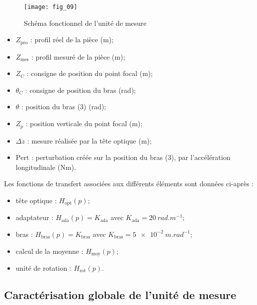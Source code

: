 \begin{figure}[H]
\centering
\texttt{[image: fig\_09]}
\caption{\label{fig_09} Schéma fonctionnel de l’unité de mesure}
\end{figure}

\begin{multicols}{2}
\begin{itemize}
\item $Z_{\text{pro}}$ : profil réel de la pièce (m);
\item $Z_{\text{mes}}$ : profil mesuré de la pièce (m);
\item $Z_{C}$ : consigne de position du point focal (m);
\item $\theta_{C}$ : consigne de position du bras (\si{rad});
\item $\theta$ : position du bras (3) (\si{rad});
\item $Z_{p}$ : position verticale du point focal (m);
\item $\Delta z$ : mesure réalisée par la tête optique (m);
\item $\text{Pert}$ : perturbation créée sur la position du bras (3), par l'accélération longitudinale (\si{Nm}).
\end{itemize}
\end{multicols}

Les fonctions de transfert associées aux différents éléments sont données ci-après : 
\begin{itemize}
\item tête optique : $H_{\text{opt}}(p)$;
\item adaptateur : $H_{\text{ada}}(p)=K_{\text{ada}}$ avec $K_{\text{ada}}=\SI{20}{rad.m^{-1}}$;
\item bras : $H_{\text{bras}}(p)=K_{\text{bras}}$ avec $K_{\text{bras}}=\SI{5e-2}{m.rad^{-1}}$;
\item calcul de la moyenne : $H_{\text{moy}}(p)$;
\item unité de rotation : $H_{\text{rot}}(p)$.
\end{itemize}




\subsection{Caractérisation globale de l'unité de mesure}

